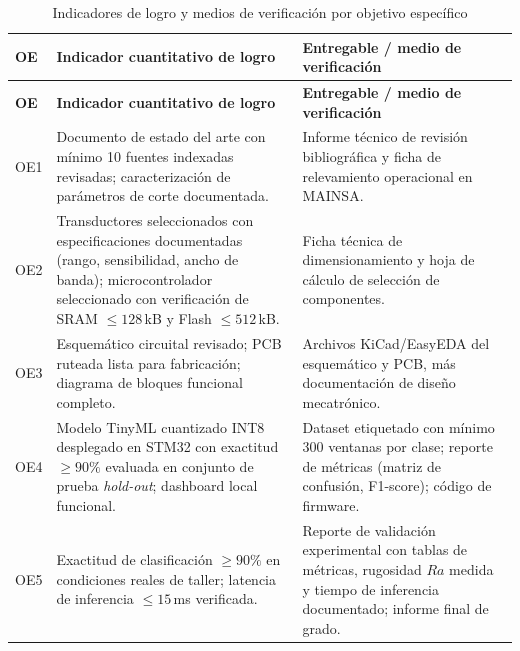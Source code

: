 {\setlength{\parskip}{1.5pt}
\begin{longtable}{|>{\raggedright\arraybackslash}p{1.1cm}|>{\raggedright\arraybackslash}p{6.3cm}|>{\raggedright\arraybackslash}p{5.7cm}|}
\caption{Indicadores de logro y medios de verificación por objetivo específico}
\label{tab:indicadores_logro}
\\
\hline
\textbf{OE} & \textbf{Indicador cuantitativo de logro} & \textbf{Entregable / medio de verificación} \\
\hline \hline
\endfirsthead

\hline
\textbf{OE} & \textbf{Indicador cuantitativo de logro} & \textbf{Entregable / medio de verificación} \\
\hline \hline
\endhead

\hline
\endfoot

\hline
\multicolumn{3}{c}{\rule{0pt}{3ex}\textbf{Fuente:} Elaboración propia, 2026.}
\endlastfoot

OE1 & Documento de estado del arte con mínimo 10 fuentes indexadas revisadas; caracterización de parámetros de corte documentada. & Informe técnico de revisión bibliográfica y ficha de relevamiento operacional en MAINSA. \\ \hline

OE2 & Transductores seleccionados con especificaciones documentadas (rango, sensibilidad, ancho de banda); microcontrolador seleccionado con verificación de SRAM $\leq 128$\,kB y Flash $\leq 512$\,kB. & Ficha técnica de dimensionamiento y hoja de cálculo de selección de componentes. \\ \hline

OE3 & Esquemático circuital revisado; PCB ruteada lista para fabricación; diagrama de bloques funcional completo. & Archivos KiCad/EasyEDA del esquemático y PCB, más documentación de diseño mecatrónico. \\ \hline

OE4 & Modelo TinyML cuantizado INT8 desplegado en STM32 con exactitud $\geq 90\%$ evaluada en conjunto de prueba \textit{hold-out}; dashboard local funcional. & Dataset etiquetado con mínimo 300 ventanas por clase; reporte de métricas (matriz de confusión, F1-score); código de firmware. \\ \hline

OE5 & Exactitud de clasificación $\geq 90\%$ en condiciones reales de taller; latencia de inferencia $\leq 15$\,ms verificada. & Reporte de validación experimental con tablas de métricas, rugosidad $Ra$ medida y tiempo de inferencia documentado; informe final de grado. \\ \hline

\end{longtable}
}
